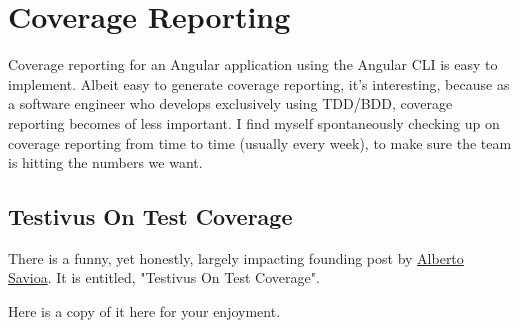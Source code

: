 \chapter{ Coverage Reporting }

Coverage reporting for an Angular application using the Angular CLI is easy to implement. Albeit easy to generate coverage reporting, it's interesting, because as a software engineer who develops exclusively using TDD/BDD, coverage reporting becomes of less important. I find myself spontaneously checking up on coverage reporting from time to time (usually every week), to make sure the team is hitting the numbers we want.

\section{Testivus On Test Coverage}
There is a funny, yet honestly, largely impacting founding post by \href{artima.com/weblogs/viewpost.jsp?thread=204677}{Alberto Savioa}. It is entitled, "Testivus On Test Coverage".

Here is a copy of it here for your enjoyment.

